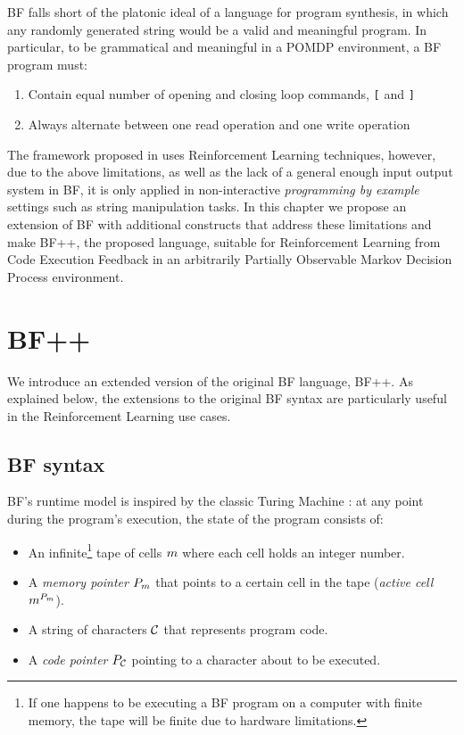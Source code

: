 BF falls short of the platonic ideal of a language for program synthesis, in which any randomly generated string would be a valid and meaningful program.
In particular, to be grammatical and meaningful in a POMDP environment, a BF program must:
\begin{enumerate}
    \item Contain equal number of opening and closing loop commands, \texttt{[} and \texttt{]}
    \item Always alternate between one read operation and one write operation
\end{enumerate}

The framework proposed in \cite{abolafiaNeuralProgramSynthesis2018} uses Reinforcement Learning techniques, however, due to the above limitations, as well as the lack of a general enough input output system in BF, it is only applied in non-interactive \emph{programming by example} settings such as string manipulation tasks.
In this chapter we propose an extension of BF with additional constructs that address these limitations and make BF++, the proposed language, suitable for Reinforcement Learning from Code Execution Feedback in an arbitrarily Partially Observable Markov Decision Process environment.

\newpage
\section{BF++}

We introduce an extended version of the original BF language, BF++. 
As explained below, the extensions to the original BF syntax are particularly useful in the Reinforcement Learning use cases. 

\subsection{BF syntax}
\label{sec:bf}

BF's runtime model is inspired by the classic Turing Machine \cite{turing}: at any point during the program's execution, the state of the program consists of:

\begin{itemize}
    \item An infinite\footnote{If one happens to be executing a BF program on a computer with finite memory, the tape will be finite due to hardware limitations.} tape of cells $m$ where each cell holds an integer number.
    \item A \textit{memory pointer} $P_m$ that points to a certain cell in the tape (\textit{active cell} $m^{P_m}$).
    \item A string of characters $\mathcal{C}$ that represents program code.
    \item A \textit{code pointer} $P_{\mathcal{C}}$ pointing to a character about to be executed.
\end{itemize}

